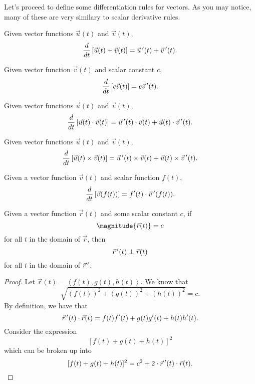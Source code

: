Let's proceed to define some differentiation rules for vectors. As you may notice, many of these are very similary to scalar derivative rules.

\begin{proposition}
    Given vector functions $\vec{u}(t)$ and $\vec{v}(t)$,
    \[\frac{d}{dt}\left[\vec{u}(t) + \vec{v}(t)\right] = \vec{u}\,^{\prime}(t) + \vec{v}\,^{\prime}(t).\]
\end{proposition}

\begin{proposition}
    Given vector function $\vec{v}(t)$ and scalar constant $c$,
    \[\frac{d}{dt}\left[c\vec{v}(t)\right] = c\vec{v}\,^{\prime}(t).\]
\end{proposition}

\begin{proposition}
    Given vector functions $\vec{u}(t)$ and $\vec{v}(t)$,
    \[\frac{d}{dt}\left[\vec{u}(t) \cdot \vec{v}(t)\right] = \vec{u}\,^{\prime}(t) \cdot \vec{v}(t) + \vec{u}(t) \cdot \vec{v}\,^{\prime}(t).\]
\end{proposition}

\begin{proposition}
    Given vector functions $\vec{u}(t)$ and $\vec{v}(t)$,
    \[\frac{d}{dt}\left[\vec{u}(t) \times \vec{v}(t)\right] = \vec{u}\,^{\prime}(t) \times \vec{v}(t) + \vec{u}(t) \times \vec{v}\,^{\prime}(t).\]
\end{proposition}

\begin{proposition}
    Given a vector function $\vec{v}(t)$ and scalar function $f(t)$,
    \[\frac{d}{dt}\left[\vec{v}(f(t))\right] = f^{\prime}(t)\cdot \vec{v}\,^{\prime}(f(t)).\]
\end{proposition}

\begin{theorem}
    Given a vector function $\vec{r}(t)$ and some scalar constant $c$, if
    \[\magnitude{\vec{r}(t)} = c\]
    for all $t$ in the domain of $\vec{r}$, then
    \[\vec{r}\,^{\prime}(t) \perp \vec{r}(t)\]
    for all $t$ in the domain of $\vec{r}\,^{\prime}$.
\end{theorem}

\begin{proof}
    Let $\vec{r}(t) = \left<f(t), g(t), h(t)\right>$. We know that
    \[\sqrt{(f(t))^{2} + (g(t))^{2} + (h(t))^{2}} = c.\]
    By definition, we have that
    \[\vec{r}\,^{\prime}(t) \cdot \vec{r}(t) = f(t)f'(t) + g(t)g'(t) + h(t)h'(t).\]
    Consider the expression
    \[[f(t) + g(t) + h(t)]^{2}\]
    which can be broken up into
    \[[f(t) + g(t) + h(t)]^{2} = c^{2} + 2 \cdot \vec{r}\,^{\prime}(t) \cdot \vec{r}(t).\]
\end{proof}